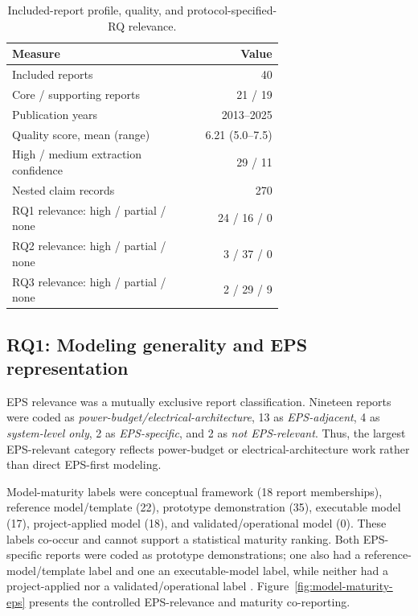 \documentclass[alpha-refs]{wiley-article}
\begin{document}
\begin{table}[tbp]
\centering
\small
\caption{Included-report profile, quality, and protocol-specified-RQ relevance.}
\label{tab:report-profile}
\begin{tabular}{>{\raggedright\arraybackslash}p{0.67\linewidth}r}
\toprule
Measure & Value \\
\midrule
Included reports & 40 \\
Core / supporting reports & 21 / 19 \\
Publication years & 2013--2025 \\
Quality score, mean (range) & 6.21 (5.0--7.5) \\
High / medium extraction confidence & 29 / 11 \\
Nested claim records & 270 \\
RQ1 relevance: high / partial / none & 24 / 16 / 0 \\
RQ2 relevance: high / partial / none & 3 / 37 / 0 \\
RQ3 relevance: high / partial / none & 2 / 29 / 9 \\
\bottomrule
\end{tabular}
\end{table}

\subsection{RQ1: Modeling generality and EPS representation}
\label{sec:results-rq1}

EPS relevance was a mutually exclusive report classification.  Nineteen reports were coded as \emph{power-budget/electrical-architecture}, 13 as \emph{EPS-adjacent}, 4 as \emph{system-level only}, 2 as \emph{EPS-specific}, and 2 as \emph{not EPS-relevant}.  Thus, the largest EPS-relevant category reflects power-budget or electrical-architecture work rather than direct EPS-first modeling.

Model-maturity labels were conceptual framework (18 report memberships), reference model/template (22), prototype demonstration (35), executable model (17), project-applied model (18), and validated/operational model (0).  These labels co-occur and cannot support a statistical maturity ranking.  Both EPS-specific reports were coded as prototype demonstrations; one also had a reference-model/template label and one an executable-model label, while neither had a project-applied nor a validated/operational label \cite{paper-0026,paper-0059}.  Figure~\ref{fig:model-maturity-eps} presents the controlled EPS-relevance and maturity co-reporting.
\end{document}
